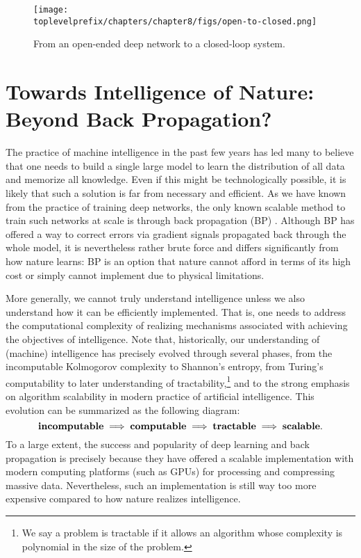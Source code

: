 \documentclass[../../book-main.tex]{subfiles}
\begin{document}
\begin{figure}[t]
    \centering    
    \texttt{[image: \\toplevelprefix/chapters/chapter8/figs/open-to-closed.png]}
    \caption{From an open-ended deep network to a closed-loop system.}
    \label{fig:open-to-closed}
\end{figure}



\section{Towards Intelligence of Nature: Beyond Back Propagation?}
The practice of machine intelligence in the past few years has led many to believe that one needs to build a single large model to learn the distribution of all data and memorize all knowledge. Even if this might be technologically possible, it is likely that such a solution is far from necessary and efficient. As we have known from the practice of training deep networks, the only known scalable method to train such networks at scale is through back propagation (BP) \cite{Back-Prop}. Although BP has offered a way to correct errors via gradient signals propagated back through the whole model, it is nevertheless rather brute force and differs significantly from how nature learns: BP is an option that nature cannot afford in terms of its high cost or simply cannot implement due to physical limitations. 

More generally, we cannot truly understand intelligence unless we also understand how it can be efficiently implemented. That is, one needs to address the computational complexity of realizing mechanisms associated with achieving the objectives of intelligence. Note that, historically, our understanding of (machine) intelligence has precisely evolved through several phases, from the incomputable Kolmogorov complexity to Shannon's entropy, from Turing's computability to later understanding of  tractability,\footnote{We say a problem is tractable if it allows an algorithm whose complexity is polynomial in the size of the problem.} and to the strong emphasis on algorithm scalability in modern practice of artificial intelligence. This evolution can be summarized as the following diagram:
\begin{equation}
   \mbox{\textbf{incomputable}} \;
   \Longrightarrow \; \mbox{\textbf{computable}} \;
   \Longrightarrow \; \mbox{\textbf{tractable}} \; \Longrightarrow \; 
   \mbox{\textbf{scalable}}.
\end{equation}
To a large extent, the success and popularity of deep learning and back propagation is precisely because they have offered a  scalable implementation with modern computing platforms (such as GPUs) for processing and compressing massive data. Nevertheless, such an implementation is still way too more expensive compared to how nature realizes intelligence. 
\end{document}
